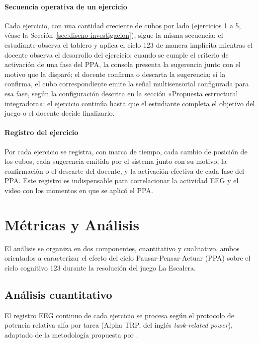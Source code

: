 \documentclass{book}
\begin{document}
\paragraph{Secuencia operativa de un ejercicio}
Cada ejercicio, con una cantidad creciente de cubos por lado (ejercicios 1 a 5, véase la Sección~\ref{sec:diseno-investigacion}), sigue la misma secuencia: el estudiante observa el tablero y aplica el ciclo 123 de manera implícita mientras el docente observa el desarrollo del ejercicio; cuando se cumple el criterio de activación de una fase del PPA, la consola presenta la sugerencia junto con el motivo que la disparó; el docente confirma o descarta la sugerencia; si la confirma, el cubo correspondiente emite la señal multisensorial configurada para esa fase, según la configuración descrita en la sección «Propuesta estructural integradora»; el ejercicio continúa hasta que el estudiante completa el objetivo del juego o el docente decide finalizarlo.

\paragraph{Registro del ejercicio}
Por cada ejercicio se registra, con marca de tiempo, cada cambio de posición de los cubos, cada sugerencia emitida por el sistema junto con su motivo, la confirmación o el descarte del docente, y la activación efectiva de cada fase del PPA. Este registro es indispensable para correlacionar la actividad EEG y el video con los momentos en que se aplicó el PPA.

\section{Métricas y Análisis}

El análisis se organiza en dos componentes, cuantitativo y cualitativo, ambos orientados a caracterizar el efecto del ciclo Pausar-Pensar-Actuar (PPA) sobre el ciclo cognitivo 123 durante la resolución del juego La Escalera.

\subsection{Análisis cuantitativo}

El registro EEG continuo de cada ejercicio se procesa según el protocolo de potencia relativa alfa por tarea (Alpha TRP, del inglés \textit{task-related power}), adaptado de la metodología propuesta por \citet{Liang2018}.
\end{document}

